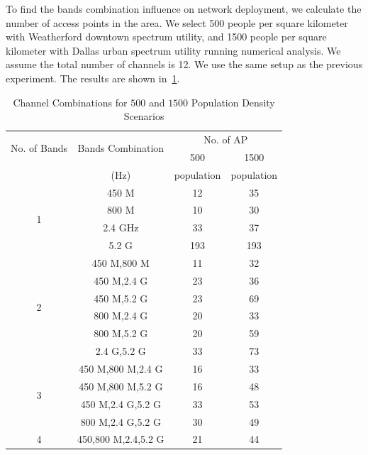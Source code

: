 To find the bands combination influence on network deployment, we calculate the number of access
points in the area. We select 500 people per square kilometer with Weatherford 
downtown spectrum utility, and 1500 people per square kilometer with Dallas urban spectrum utility
running numerical analysis. We assume the total number of channels is 12. We use the same setup 
as the previous experiment. The results are shown in~\ref{tab:500comb}.
 
 
 \begin{table}[h]
 \centering
 \begin{tabular}{|c|c|c|c|}
 \hline
 \multirow{2}{*}{No. of Bands} & \multirow{2}{*}{Bands Combination} & \multicolumn{2}{c|}{No. of AP} \\
 \cline{3-4}
  &  & 500 & 1500 \\
 & (Hz) & population &  population \\
 \hline
 \multirow{4}{*}{1}    & 450 M  & 12  & 35 \\
 \cline{2-4}
                              & 800 M & 10  &  30 \\
 \cline{2-4}
			      & 2.4 GHz & 33  &  37 \\
 \cline{2-4}
                              & 5.2 G & 193 &  193 \\ 
 \hline
 \multirow{6}{*}{2}   & 450 M,800 M & 11  & 32\\
 \cline{2-4}
                              & 450 M,2.4 G & 23  & 36\\
 \cline{2-4}
			      & 450 M,5.2 G & 23  & 69\\
 \cline{2-4}
			      & 800 M,2.4 G & 20  & 33\\ 
 \cline{2-4}
			      & 800 M,5.2 G & 20  & 59\\ 
 \cline{2-4}
			      & 2.4 G,5.2 G & 33  & 73\\ 
 \hline
 \multirow{4}{*}{3} & 450 M,800 M,2.4 G & 16  & 33\\
 \cline{2-4}
                              & 450 M,800 M,5.2 G & 16  & 48\\
 \cline{2-4}
			      & 450 M,2.4 G,5.2 G & 33  & 53\\
 \cline{2-4}
			      & 800 M,2.4 G,5.2 G & 30 &  49\\ 
 \hline
 4  & 450,800 M,2.4,5.2 G & 21  & 44 \\
 \hline
 \end{tabular}
 \caption{Channel Combinations for $500$ and $1500$ Population Density Scenarios}
 \label{tab:500comb}
 \end{table}


